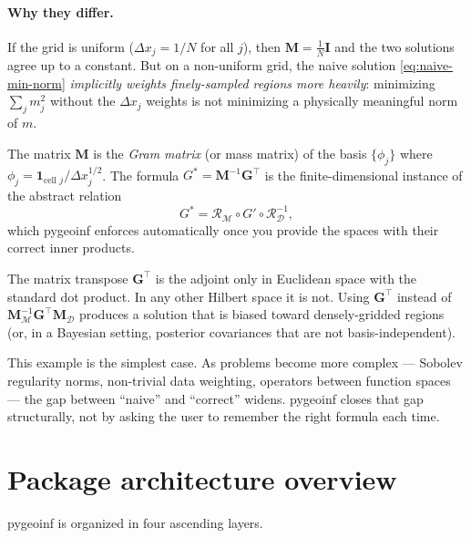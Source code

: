 \documentclass[11pt,twoside,openright]{book}
\theoremstyle{plain}
\theoremstyle{definition}
\theoremstyle{remark}
\newcommand{\modelspace}{\mathcal{M}}
\newcommand{\dataspace}{\mathcal{D}}
\begin{document}
\paragraph{Why they differ.}
If the grid is uniform ($\Delta x_j = 1/N$ for all $j$), then
$\mathbf{M} = \tfrac{1}{N}\mathbf{I}$ and the two solutions agree up to
a constant. But on a non-uniform grid, the naive solution
\eqref{eq:naive-min-norm} \emph{implicitly weights finely-sampled
regions more heavily}: minimizing $\sum_j m_j^2$ without the $\Delta x_j$
weights is not minimizing a physically meaningful norm of $m$.

The matrix $\mathbf{M}$ is the \emph{Gram matrix} (or mass matrix) of the
basis $\{\phi_j\}$ where $\phi_j = \mathbf{1}_{\text{cell }j} / \Delta x_j^{1/2}$.
The formula $G^* = \mathbf{M}^{-1}\mathbf{G}^\top$ is the finite-dimensional
instance of the abstract relation
\begin{equation}
  \label{eq:hilbert-adjoint-abstract}
  G^* = \mathcal{R}_{\modelspace} \circ G' \circ \mathcal{R}_{\dataspace}^{-1},
\end{equation}
which pygeoinf enforces automatically once you provide the spaces with
their correct inner products.

\begin{pitfallbox}
The matrix transpose $\mathbf{G}^\top$ is the adjoint only in Euclidean
space with the standard dot product. In any other Hilbert space it is
not. Using $\mathbf{G}^\top$ instead of
$\mathbf{M}_{\mathcal{M}}^{-1}\mathbf{G}^\top\mathbf{M}_{\mathcal{D}}$
produces a solution that is biased toward densely-gridded regions (or,
in a Bayesian setting, posterior covariances that are not
basis-independent).
\end{pitfallbox}

This example is the simplest case. As problems become more complex ---
Sobolev regularity norms, non-trivial data weighting, operators between
function spaces --- the gap between ``naive'' and ``correct'' widens.
pygeoinf closes that gap structurally, not by asking the user to remember
the right formula each time.

\section{Package architecture overview}
\label{sec:architecture}

pygeoinf is organized in four ascending layers.
\end{document}
